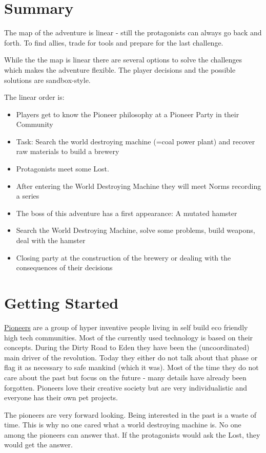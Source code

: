 \section{Summary}

The map of the adventure is linear - still the protagonists can always go back and forth. To find allies, trade for tools and prepare for the last challenge.

While the the map is linear there are several options to solve the challenges which makes the adventure flexible. The player decisions and the possible solutions are sandbox-style.

The linear order is:

\begin{itemize}
\item Players get to know the Pioneer philosophy at a Pioneer Party in their Community
\item Task: Search the world destroying machine (=coal power plant) and recover raw materials to build a brewery
\item Protagonists meet some Lost.
\item After entering the World Destroying Machine they will meet Norms recording a series
\item The boss of this adventure has a first appearance: A mutated hamster
\item Search the World Destroying Machine, solve some problems, build weapons, deal with the hamster
\item Closing party at the construction of the brewery or dealing with the consequences of their decisions
\end{itemize}

\section{Getting Started}

\begin{sidebarBox}[title=Pioneers]
\hyperref[sec:Pioneers]{Pioneers} are a group of hyper inventive people living in self build eco friendly high tech communities. Most of the currently used technology is based on their concepts. During the Dirty Road to Eden they have been the (uncoordinated) main driver of the revolution. Today they either do not talk about that phase or flag it as necessary to safe mankind (which it was). Most of the time they do not care about the past but focus on the future - many details have already been forgotten. Pioneers love their creative society but are very individualistic and everyone has their own pet projects.

The pioneers are very forward looking. Being interested in the past is a waste of time. This is why no one cared what a world destroying machine is. No one among the pioneers can answer that. If the protagonists would ask the Lost, they would get the answer.
\end{sidebarBox}

